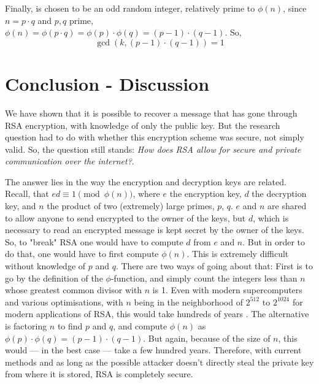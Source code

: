 \documentclass[12pt, titlepage]{article}
\let\oldsection\section
\renewcommand\section{\clearpage\oldsection}
\begin{document}
Finally,  is chosen to be an odd random integer, relatively prime to $\phi(n)$,
since $n=p \cdot q$ and $p,q$ prime, $\phi(n) = \phi(p \cdot q) = \phi(p) \cdot \phi(q) =
(p-1) \cdot (q-1)$. So, 
%
\begin{equation*}
    \gcd(k, (p-1) \cdot (q-1)) = 1
\end{equation*}
%

\section{Conclusion - Discussion}

We have shown that it is possible to recover a message that has gone through RSA encryption,
with knowledge of only the public key. But the research question had to do with whether this
encryption scheme was secure, not simply valid. So, the question still stands: \emph{How
does RSA allow for secure and private communication over the internet?}. 

The answer lies in the way the encryption and decryption keys are related. Recall, that
$ed\equiv 1 \pmod{\phi(n)}$, where $e$ the encryption key, $d$ the decryption key, and $n$
the product of two (extremely) large primes, $p$, $q$. $e$ and $n$ are shared to allow
anyone to send encrypted to the owner of the keys, but $d$, which is necessary to read an
encrypted message is kept secret by the owner of the keys. So, to "break" RSA one would have
to compute $d$ from $e$ and $n$. But in order to do that, one would have to first compute
$\phi(n)$. This is extremely difficult without knowledge of $p$ and $q$. There are two ways
of going about that: First is to go by the definition of the $\phi$-function, and simply
count the integers less than $n$ whose greatest common divisor with $n$ is 1. Even with
modern supercomputers and various optimisations, with $n$ being in the neighborhood of
$2^{512}$ to $2^{1024}$ for modern applications of RSA, this would take hundreds of years
\autocite{prime_factorisation}. The alternative is factoring $n$ to find $p$ and $q$, and
compute $\phi(n)$ as $\phi(p) \cdot \phi(q) = (p-1) \cdot (q-1)$. But again, because of the
size of $n$, this would --- in the best case --- take a few hundred years. Therefore, with
current methods and as long as the possible attacker doesn't directly steal the private key
from where it is stored, RSA is completely secure.
\end{document}
